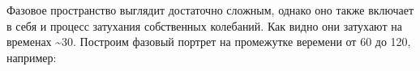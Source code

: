 \documentclass[11pt]{article}
\begin{document}
    \begin{center}
    \end{center}
    { \hspace*{\fill} \\}
    
    \begin{center}
    \end{center}
    { \hspace*{\fill} \\}
    
    Фазовое пространство выглядит достаточно сложным, однако оно также
включает в себя и процесс затухания собственных колебаний. Как видно они
затухают на временах \textasciitilde30. Построим фазовый портрет на
промежутке веремени от 60 до 120, например:
\end{document}
